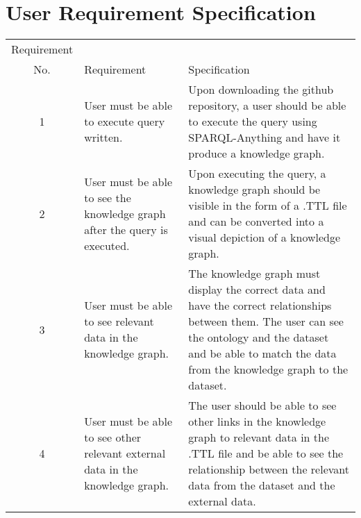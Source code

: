 \begin{table}[h!]
\section{User Requirement Specification}
\begin{center}
\begin{tabular}{c|p{2in}p{2.55in}}
Requirement \\ No.&Requirement&Specification\\\hline 
1&User must be able to execute query written.& Upon downloading the github repository, a user should be able to execute the query using SPARQL-Anything and have it produce a knowledge graph.\\
2&User must be able to see the knowledge graph after the query is executed.&Upon executing the query, a knowledge graph should be visible in the form of a .TTL file and can be converted into a visual depiction of a knowledge graph.\\
3&User must be able to see relevant data in the knowledge graph.& The knowledge graph must display the correct data and have the correct relationships between them. The user can see the ontology and the dataset and be able to match the data from the knowledge graph to the dataset.\\
4&User must be able to see other relevant external data in the knowledge graph.& The user should be able to see other links in the knowledge graph to relevant data in the .TTL file and be able to see the relationship between the relevant data from the dataset and the external data.
\end{tabular}
\end{center}
\end{table}

